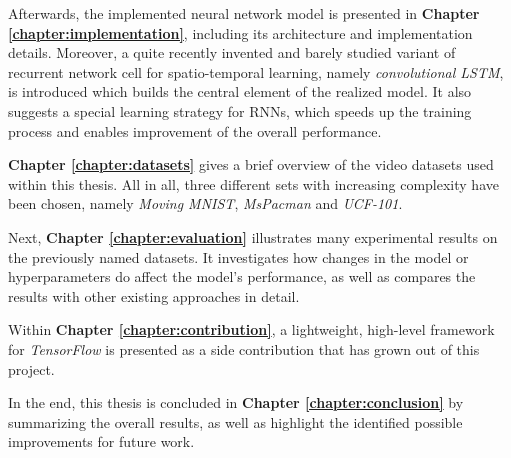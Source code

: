 Afterwards, the implemented neural network model is presented in \textbf{Chapter \ref{chapter:implementation}}, including its architecture and implementation details. Moreover, a quite recently invented and barely studied variant of recurrent network cell for spatio-temporal learning, namely \textit{convolutional LSTM}, is introduced which builds the central element of the realized model. It also suggests a special learning strategy for RNNs, which speeds up the training process and enables improvement of the overall performance.

\textbf{Chapter \ref{chapter:datasets}} gives a brief overview of the video datasets used within this thesis. All in all, three different sets with increasing complexity have been chosen, namely \textit{Moving MNIST}, \textit{MsPacman} and \textit{UCF-101}.

Next, \textbf{Chapter \ref{chapter:evaluation}} illustrates many experimental results on the previously named datasets. It investigates how changes in the model or hyperparameters do affect the model's performance, as well as compares the results with other existing approaches in detail.

Within \textbf{Chapter \ref{chapter:contribution}}, a lightweight, high-level framework for \textit{TensorFlow} is presented as a side contribution that has grown out of this project.

In the end, this thesis is concluded in \textbf{Chapter \ref{chapter:conclusion}} by summarizing the overall results, as well as highlight the identified possible improvements for future work.



